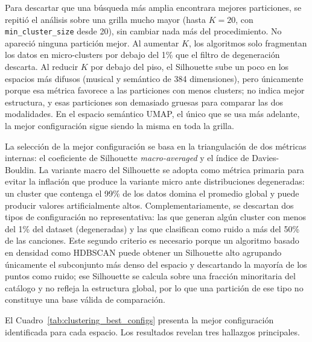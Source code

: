 Para descartar que una búsqueda más amplia encontrara mejores particiones, se repitió el análisis sobre una grilla mucho mayor (hasta $K = 20$, con \texttt{min\_cluster\_size} desde 20), sin cambiar nada más del procedimiento. No apareció ninguna partición mejor. Al aumentar $K$, los algoritmos solo fragmentan los datos en micro-clusters por debajo del 1\% que el filtro de degeneración descarta. Al reducir $K$ por debajo del piso, el Silhouette sube un poco en los espacios más difusos (musical y semántico de 384 dimensiones), pero únicamente porque esa métrica favorece a las particiones con menos clusters; no indica mejor estructura, y esas particiones son demasiado gruesas para comparar las dos modalidades. En el espacio semántico UMAP, el único que se usa más adelante, la mejor configuración sigue siendo la misma en toda la grilla.

La selección de la mejor configuración se basa en la triangulación de dos métricas internas: el coeficiente de Silhouette \textit{macro-averaged} y el índice de Davies-Bouldin. La variante macro del Silhouette se adopta como métrica primaria para evitar la inflación que produce la variante micro ante distribuciones degeneradas: un cluster que contenga el 99\% de los datos domina el promedio global y puede producir valores artificialmente altos. Complementariamente, se descartan dos tipos de configuración no representativa: las que generan algún cluster con menos del 1\% del dataset (degeneradas) y las que clasifican como ruido a más del 50\% de las canciones. Este segundo criterio es necesario porque un algoritmo basado en densidad como HDBSCAN puede obtener un Silhouette alto agrupando únicamente el subconjunto más denso del espacio y descartando la mayoría de los puntos como ruido; ese Silhouette se calcula sobre una fracción minoritaria del catálogo y no refleja la estructura global, por lo que una partición de ese tipo no constituye una base válida de comparación.



El Cuadro~\ref{tab:clustering_best_configs} presenta la mejor configuración identificada para cada espacio. Los resultados revelan tres hallazgos principales.

